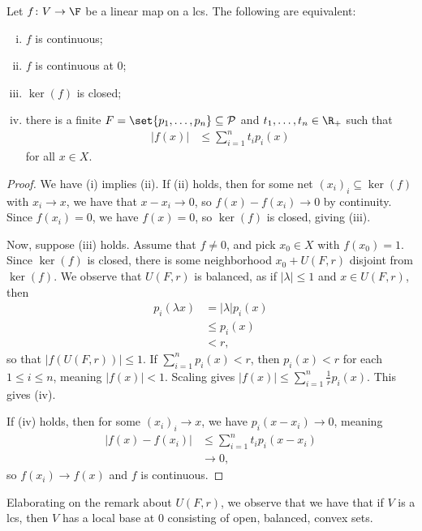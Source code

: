 \documentclass[10pt]{mypackage}
\begin{document}
\begin{proposition}
  Let $f\colon V\rightarrow \F$ be a linear map on a lcs. The following are equivalent:
  \begin{enumerate}[(i)]
    \item $f$ is continuous;
    \item $f$ is continuous at $0$;
    \item $\ker\left( f \right)$ is closed;
    \item there is a finite $F = \set{p_1,\dots,p_n}\subseteq \mathcal{P}$ and $t_1,\dots,t_n\in \R_{+}$  such that
      \begin{align*}
        \left\vert f(x) \right\vert &\leq \sum_{i=1}^{n}t_ip_i(x)
      \end{align*}
      for all $x\in X$.
  \end{enumerate}
\end{proposition}
\begin{proof}
  We have (i) implies (ii). If (ii) holds, then for some net $\left( x_i \right)_i\subseteq \ker\left( f \right)$ with $x_i\rightarrow x$, we have that $x-x_i\rightarrow 0$, so $f\left( x \right)-f\left(x_i\right)\rightarrow 0$ by continuity. Since $f\left( x_i \right) = 0$, we have $f(x) = 0$, so $\ker\left( f \right)$ is closed, giving (iii).

  Now, suppose (iii) holds. Assume that $f\neq 0$, and pick $x_0\in X$ with $f\left( x_0 \right) = 1$. Since $\ker\left( f \right)$ is closed, there is some neighborhood $x_0 + U\left( F,r \right)$ disjoint from $\ker\left( f \right)$. We observe that $U\left( F,r \right)$ is balanced, as if $\left\vert \lambda \right\vert\leq 1$ and $x\in U\left( F,r \right)$, then 
  \begin{align*}
    p_i\left( \lambda x \right) &= \left\vert \lambda \right\vert p_i(x) \\
                                &\leq p_i(x) \\
                                &< r,
  \end{align*}
  so that $\left\vert f\left( U\left( F,r \right) \right) \right\vert\leq 1$. If $\sum_{i=1}^{n}p_i(x) < r$, then $p_i(x) < r$ for each $1\leq i \leq n$, meaning $\left\vert f(x) \right\vert < 1$. Scaling gives $\left\vert f(x) \right\vert \leq \sum_{i=1}^{n}\frac{1}{r}p_i(x)$. This gives (iv).

  If (iv) holds, then for some $\left( x_i \right)_i\rightarrow x$, we have $p_i\left( x-x_i \right) \rightarrow 0$, meaning
  \begin{align*}
    \left\vert f(x) - f\left( x_i \right) \right\vert &\leq \sum_{i=1}^{n}t_ip_i\left( x-x_i \right)\\
                                                      &\rightarrow 0,
  \end{align*}
  so $f\left( x_i \right)\rightarrow f(x)$ and $f$ is continuous.
\end{proof}
Elaborating on the remark about $U\left( F,r \right)$, we observe that we have that if $V$ is a lcs, then $V$ has a local base at $0$ consisting of open, balanced, convex sets.
\end{document}
